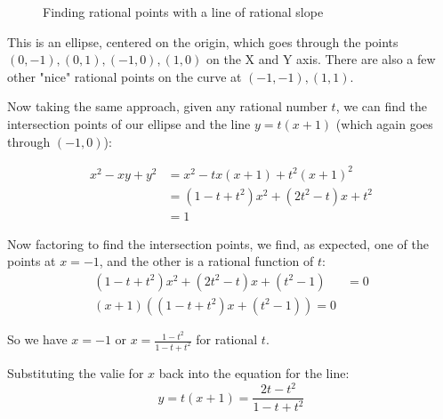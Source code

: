 \documentclass{article}
\begin{document}
\begin{figure}[htb]
        \caption{Finding rational points with a line of rational slope}
        \label{fig:eisen_ellipse}
\end{figure}

This is an ellipse, centered on the origin, which goes through the points $(0,-1), (0,1), (-1,0), (1,0)$
on the X and Y axis. There are also a few other "nice" rational points on the curve at $(-1,-1), (1,1)$.

Now taking the same approach, given any rational number $t$, we can find the intersection points of our
ellipse and the line $y = t(x+1)$ (which again goes through $(-1,0)$):

\begin{equation*}
        \begin{split}
		x^2 - xy + y^2 & = x^2 - tx(x+1)+t^2(x+1)^2 \\
		&= (1-t+t^2)x^2 +(2t^2-t)x + t^2 \\
		&= 1 
	\end{split}
\end{equation*}

Now factoring to find the intersection points, we find, as expected, one of the points at $x=-1$, and
the other is a rational function of $t$:
\begin{equation*}
	\begin{split}
		(1-t+t^2)x^2 + (2t^2-t)x + (t^2-1) &= 0 \\
		(x + 1)((1-t+t^2)x + (t^2 - 1)) = 0
        \end{split}
\end{equation*}

So we have $x = -1$ or $x = \frac{1 - t^2}{1-t+t^2}$ for rational $t$.

Substituting the valie for $x$ back into the equation for the line:
\[ y = t(x+1) = \frac{2t - t^2}{1-t+t^2} \]
\end{document}
